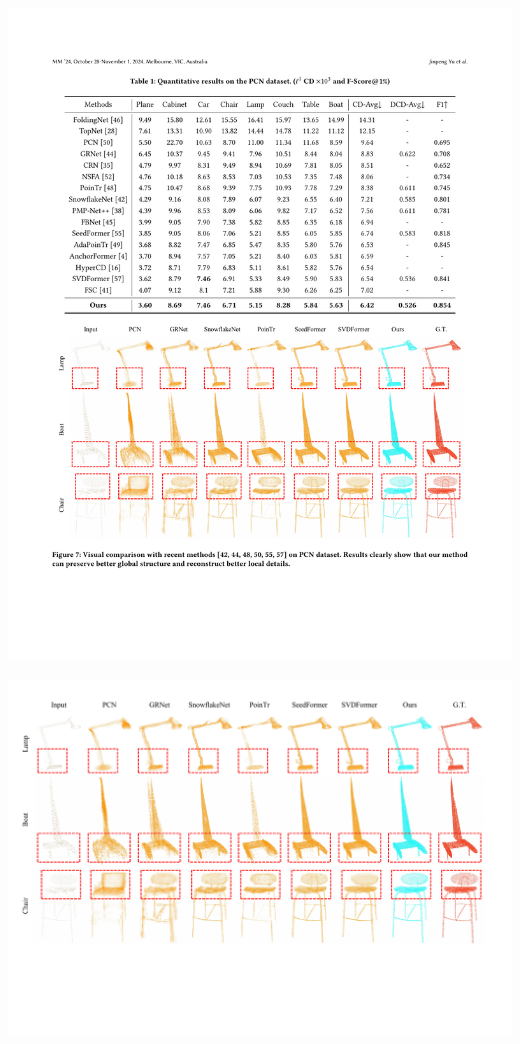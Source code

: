\documentclass[landscape,a0paper,fontscale=0.292]{baposter}
\begin{document}
\begin{poster}
{\begin{minipage}[t]{0.49\textwidth}
\begin{center}
            \includegraphics[width=\textwidth]{images/table-PCN.pdf}
        \end{center}
        \vspace{-1.5em}
        \begin{center}
            \includegraphics[width=\textwidth]{images/result-pcn.pdf}

\end{center}
\end{minipage}}
\end{poster}
\end{document}
